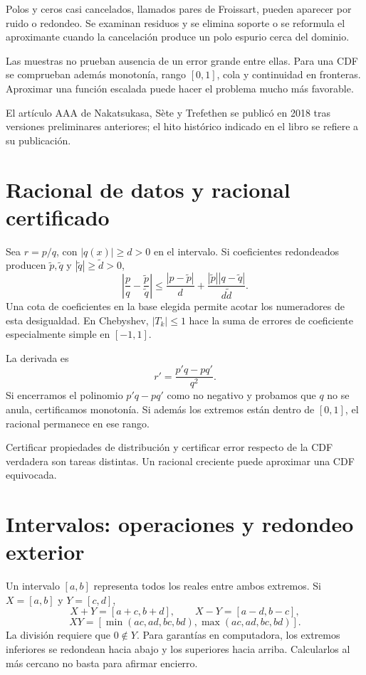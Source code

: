 \documentclass[11pt,a4paper]{article}
\theoremstyle{definition}
\newcounter{problema}
\begin{document}
Polos y ceros casi cancelados, llamados pares de Froissart, pueden aparecer por ruido o redondeo. Se examinan residuos y se elimina soporte o se reformula el aproximante cuando la cancelación produce un polo espurio cerca del dominio.

Las muestras no prueban ausencia de un error grande entre ellas. Para una CDF se comprueban además monotonía, rango $[0,1]$, cola y continuidad en fronteras. Aproximar una función escalada puede hacer el problema mucho más favorable.

El artículo AAA de Nakatsukasa, Sète y Trefethen se publicó en 2018 tras versiones preliminares anteriores; el hito histórico indicado en el libro se refiere a su publicación.

\section{Racional de datos y racional certificado}
Sea $r=p/q$, con $|q(x)|\ge d>0$ en el intervalo. Si coeficientes redondeados producen $\widetilde p,\widetilde q$ y $|\widetilde q|\ge\widetilde d>0$,
\[
\left|\frac pq-\frac{\widetilde p}{\widetilde q}\right|
\le\frac{|p-\widetilde p|}{d}
+\frac{|\widetilde p||q-\widetilde q|}{d\widetilde d}.
\]
Una cota de coeficientes en la base elegida permite acotar los numeradores de esta desigualdad. En Chebyshev, $|T_k|\le1$ hace la suma de errores de coeficiente especialmente simple en $[-1,1]$.

La derivada es
\[
r'=\frac{p'q-pq'}{q^2}.
\]
Si encerramos el polinomio $p'q-pq'$ como no negativo y probamos que $q$ no se anula, certificamos monotonía. Si además los extremos están dentro de $[0,1]$, el racional permanece en ese rango.

Certificar propiedades de distribución y certificar error respecto de la CDF verdadera son tareas distintas. Un racional creciente puede aproximar una CDF equivocada.

\section{Intervalos: operaciones y redondeo exterior}
Un intervalo $[a,b]$ representa todos los reales entre ambos extremos. Si $X=[a,b]$ y $Y=[c,d]$,
\[
X+Y=[a+c,b+d],\qquad X-Y=[a-d,b-c],
\]
\[
XY=[\min(ac,ad,bc,bd),\max(ac,ad,bc,bd)].
\]
La división requiere que $0\notin Y$. Para garantías en computadora, los extremos inferiores se redondean hacia abajo y los superiores hacia arriba. Calcularlos al más cercano no basta para afirmar encierro.
\end{document}
